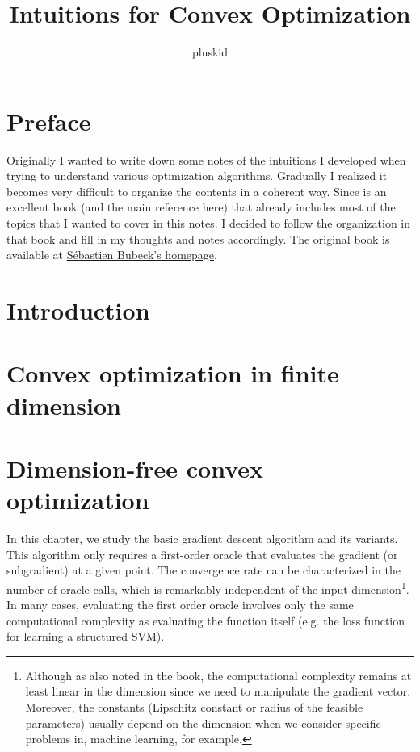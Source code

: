 \documentclass{scrartcl}
\title{Intuitions for Convex Optimization}
\author{pluskid}
\begin{document}
\maketitle
\tableofcontents

\section*{Preface}
Originally I wanted to write down some notes of the intuitions I developed when trying to
understand various optimization algorithms. Gradually I realized it becomes very difficult to
organize the contents in a coherent way. Since \citet {MAL-050} is an excellent book (and the main
reference here) that already includes most of the topics that I wanted to cover in this notes. I
decided to follow the organization in that book and fill in my thoughts and notes accordingly. The
original book is available at \href{http://www.princeton.edu/~sbubeck/}{S{\'e}bastien Bubeck's
homepage}.

\section{Introduction}
\section{Convex optimization in finite dimension}
\section{Dimension-free convex optimization}
In this chapter, we study the basic gradient descent algorithm and its variants. This algorithm only
requires a first-order oracle that evaluates the gradient (or subgradient) at a given point. The
convergence rate can be characterized in the number of oracle calls, which is remarkably independent
of the input dimension\footnote{Although as also noted in the book, the computational complexity
remains at least linear in the dimension since we need to manipulate the gradient vector. Moreover,
the constants (Lipschitz constant or radius of the feasible parameters) usually depend on the
dimension when we consider specific problems in, machine learning, for example.}. In many cases,
evaluating the first order oracle involves only the same computational complexity as evaluating the
function itself (e.g. the loss function for learning a structured SVM).
\end{document}
